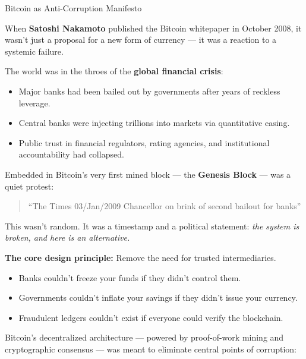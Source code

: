 \begin{HistoricalSidebar}{Bitcoin as Anti-Corruption Manifesto}

    When \textbf{Satoshi Nakamoto} published the Bitcoin whitepaper in October 2008, it wasn’t just a proposal for a new form of currency — it was a reaction to a systemic failure.
    
    \medskip
    
    The world was in the throes of the \textbf{global financial crisis}:
    
    \begin{itemize}
    \item Major banks had been bailed out by governments after years of reckless leverage.
    \item Central banks were injecting trillions into markets via quantitative easing.
    \item Public trust in financial regulators, rating agencies, and institutional accountability had collapsed.
    \end{itemize}
    
    \medskip
    
    Embedded in Bitcoin's very first mined block — the \textbf{Genesis Block} — was a quiet protest:
    
    \begin{quote}
    “The Times 03/Jan/2009 Chancellor on brink of second bailout for banks”
    \end{quote}
    
    This wasn’t random. It was a timestamp and a political statement:  
    \textit{the system is broken, and here is an alternative.}
    
    \medskip
    
    \textbf{The core design principle:}  
    Remove the need for trusted intermediaries.
    
    \begin{itemize}
    \item Banks couldn’t freeze your funds if they didn’t control them.
    \item Governments couldn’t inflate your savings if they didn’t issue your currency.
    \item Fraudulent ledgers couldn’t exist if everyone could verify the blockchain.
    \end{itemize}
    
    \medskip
    
    Bitcoin’s decentralized architecture — powered by proof-of-work mining and cryptographic consensus — was meant to eliminate central points of corruption:
    

\end{HistoricalSidebar}
